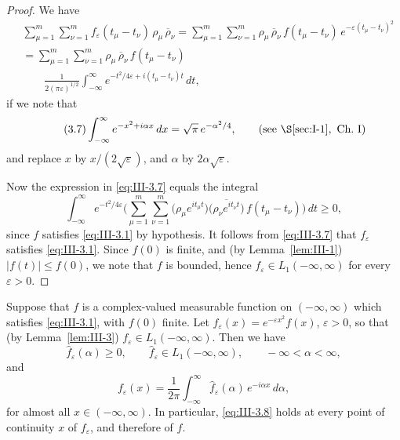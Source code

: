 \begin{proof}
We have
\begin{align*}
&\sum_{\mu=1}^{m}\sum_{\nu=1}^{m}f_{\varepsilon}(t_{\mu}-t_{\nu})\,\rho_{\mu}\,\overline{\rho}_{\nu}
=\sum_{\mu=1}^{m}\sum_{\nu=1}^{m}\rho_{\mu}\,\overline{\rho}_{\nu}\,f(t_{\mu}-t_{\nu})\,e^{-\varepsilon(t_{\mu}-t_{\nu})^{2}}\\
&=\sum_{\mu=1}^{m}\sum_{\nu=1}^{m}\rho_{\mu}\,\overline{\rho}_{\nu}\,f(t_{\mu}-t_{\nu})\,\\
&\qquad\frac{1}{2(\pi\varepsilon)^{1/2}}\int_{-\infty}^{\infty}e^{-t^{2}/4\varepsilon+i(t_{\mu}-t_{\nu})t}\,dt,
\end{align*}
if we note that
\begin{equation}\tag{3.7}\label{eq:III-3.7}
\int_{-\infty}^{\infty}e^{-x^{2}+i\alpha x}\,dx=\sqrt{\pi}\,e^{-\alpha^{2}/4},\qquad(\text{see }\S\ref{sec:I-1},\text{ Ch.~I})
\end{equation}
and replace $x$ by $x/(2\sqrt{\varepsilon})$, and $\alpha$ by $2\alpha\sqrt{\varepsilon}$.

Now the expression in \eqref{eq:III-3.7} equals the integral
\[
\int_{-\infty}^{\infty}e^{-t^{2}/4\varepsilon}
\Biggl(\sum_{\mu=1}^{m}\sum_{\nu=1}^{m}
\bigl(\rho_{\mu}e^{it_{\mu}t}\bigr)\overline{\bigl(\rho_{\nu}e^{it_{\nu}t}\bigr)}\,f(t_{\mu}-t_{\nu})\Biggr)\,dt\ge0,
\]
since $f$ satisfies \eqref{eq:III-3.1} by hypothesis. It follows from \eqref{eq:III-3.7} that $f_{\varepsilon}$ satisfies \eqref{eq:III-3.1}. Since $f(0)$ is finite, and (by Lemma~\ref{lem:III-1}) $|f(t)|\le f(0)$, we note that $f$ is bounded, hence $f_{\varepsilon}\in L_{1}(-\infty,\infty)$ for every $\varepsilon>0$.
\end{proof}

\begin{lemma}\label{lem:III-4}
Suppose that $f$ is a complex-valued measurable function on $(-\infty,\infty)$ which satisfies \eqref{eq:III-3.1}, with $f(0)$ finite. Let $f_{\varepsilon}(x)=e^{-\varepsilon x^{2}}f(x)$, $\varepsilon>0$, so that (by Lemma~\ref{lem:III-3}) $f_{\varepsilon}\in L_{1}(-\infty,\infty)$. Then we have
\[
\hat f_{\varepsilon}(\alpha)\ge0,\qquad \hat f_{\varepsilon}\in L_{1}(-\infty,\infty),\qquad-\infty<\alpha<\infty,
\]
and
\begin{equation}\tag{3.8}\label{eq:III-3.8}
f_{\varepsilon}(x)=\frac{1}{2\pi}\int_{-\infty}^{\infty}\hat f_{\varepsilon}(\alpha)\,e^{-i\alpha x}\,d\alpha,
\end{equation}
for almost all $x\in(-\infty,\infty)$. In particular, \eqref{eq:III-3.8} holds at every point of continuity $x$ of $f_{\varepsilon}$, and therefore of $f$.
\end{lemma}

